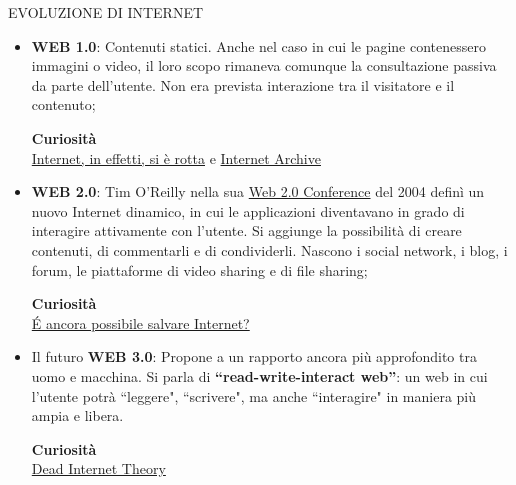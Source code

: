 \documentclass[aspectratio=1610]{beamer}
\begin{document}
\begin{frame}{EVOLUZIONE DI INTERNET}
    \begin{itemize}
        \justifying
        \item \textbf{WEB 1.0}: Contenuti statici. Anche nel caso in cui le pagine contenessero immagini o video, 
        il loro scopo rimaneva comunque la consultazione passiva da parte dell’utente. Non era prevista 
        interazione tra il visitatore e il contenuto;\\
        \begin{tiny}
            \raggedleft
            \textbf{Curiosità}\\
            \href{https://www.ilpost.it/massimomantellini/2021/10/11/internet-in-effetti-si-e-rotta/}{Internet, in effetti, si è rotta} e 
            \href{https://archive.org/}{Internet Archive}\\
        \end{tiny}
        \pause
        \item \textbf{WEB 2.0}: Tim O’Reilly nella sua \href{https://en.wikipedia.org/wiki/Web\_2.0\_Summit}{Web 2.0 Conference} del 2004 definì un nuovo Internet 
        dinamico, in cui le applicazioni diventavano in grado di interagire attivamente con l’utente. Si aggiunge 
        la possibilità di creare contenuti, di commentarli e di condividerli. Nascono i social network, i blog, 
        i forum, le piattaforme di video sharing e di file sharing;\\
        \begin{tiny}
            \raggedleft
            \textbf{Curiosità}\\
            \href{https://quantsmagazine.com/2024/10/e-ancora-possibile-salvare-internet/}{\'E ancora possibile salvare Internet?}\\
        \end{tiny}
        \pause
        \item Il futuro \textbf{WEB 3.0}: Propone a un rapporto ancora più approfondito tra uomo e macchina. 
        Si parla di \textbf{“read-write-interact web”}: un web in cui l’utente potrà ``leggere", ``scrivere", ma 
        anche ``interagire" in maniera più ampia e libera.\\
        \begin{tiny}
            \raggedleft
            \textbf{Curiosità}\\
            \href{https://it.wikipedia.org/wiki/Teoria_di_Internet_morto}{Dead Internet Theory}\\
        \end{tiny}
    \end{itemize}
\end{frame}
\end{document}
